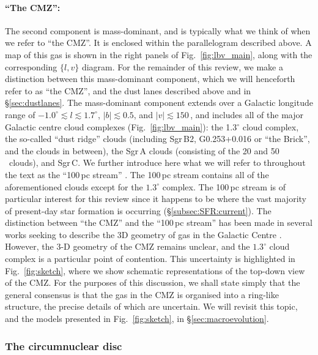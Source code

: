 \paragraph{``The CMZ'':}\label{subsubsec:cmz} The second component is mass-dominant, and is typically what we think of when we refer to ``the CMZ''. It is enclosed within the parallelogram described above. A map of this gas is shown in the right panels of Fig.~\ref{fig:lbv_main}, along with the corresponding $\{l,v\}$ diagram. For the remainder of this review, we make a distinction between this mass-dominant component, which we will henceforth refer to as ``the CMZ'', and the dust lanes described above and in \S\ref{sec:dustlanes}. The mass-dominant component extends over a Galactic longitude range of $-1.0^{\circ}\lesssim l \lesssim 1.7^{\circ}$, $|b|\lesssim0.5$, and $|v|\lesssim 150$\,\kms, and includes all of the major Galactic centre cloud complexes (Fig.~\ref{fig:lbv_main}): the 1.3$^{\circ}$ cloud complex, the so-called ``dust ridge'' clouds (including Sgr\,B2, G0.253+0.016 or ``the Brick'', and the clouds in between), the Sgr\,A clouds (consisting of the 20 and 50\,\kms \ clouds), and Sgr\,C. 
We further introduce here what we will refer to throughout the text as the ``100\,pc stream'' \citep{Kruijssen2015}. The 100\,pc stream contains all of the aforementioned clouds except for the $1.3^{\circ}$ complex. The 100\,pc stream is of particular interest for this review since it happens to be where the vast majority of present-day star formation is occurring (\S\ref{subsec:SFR:current}). The distinction between ``the CMZ'' and the ``100\,pc stream'' has been made in several works seeking to describe the 3D geometry of gas in the Galactic Centre \citep[\S\ref{sec:3d};][]{Rodriguez-Fernandez2006, Bally2010, Molinari2011, Kruijssen2015, Henshaw2016a}. However, the 3-D geometry of the CMZ remains unclear, and the $1.3^{\circ}$ cloud complex is a particular point of contention. This uncertainty is highlighted in Fig.~\ref{fig:sketch}, where we show schematic representations of the top-down view of the CMZ. For the purposes of this discussion, we shall state simply that the general consensus is that the gas in the CMZ is organised into a ring-like structure, the precise details of which are uncertain. We will revisit this topic, and the models presented in Fig.~\ref{fig:sketch}, in \S\ref{sec:macroevolution}.

\subsubsection{The circumnuclear disc}\label{sec:cnd} 


